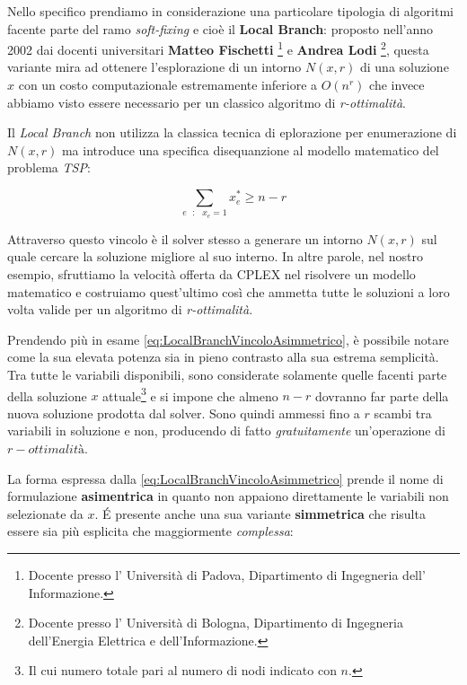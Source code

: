 \documentclass[11pt]{article}
\begin{document}
Nello specifico prendiamo in considerazione una particolare tipologia di algoritmi facente parte del ramo \textit{soft-fixing} e cioè il \textbf{Local Branch}: proposto nell'anno 2002 dai docenti universitari \textbf{Matteo Fischetti} \footnote{Docente presso l' Università di Padova, Dipartimento di Ingegneria dell’ Informazione.} e \textbf{Andrea Lodi} \footnote{Docente presso l' Università di Bologna, Dipartimento di Ingegneria dell'Energia Elettrica e dell'Informazione.}, questa variante mira ad ottenere l'esplorazione di un intorno $N(x,r)$ di una soluzione $x$ con un costo computazionale estremamente inferiore a $O(n^r)$ che invece abbiamo visto essere necessario per un classico algoritmo di \textit{r-ottimalità}.

Il \textit{Local Branch} non utilizza la classica tecnica di eplorazione per enumerazione di $N(x,r)$ ma introduce una specifica disequanzione al modello matematico del problema \textit{TSP}:


\begin{equation}\label{eq:LocalBranchVincoloAsimmetrico}
\displaystyle\sum_{e \text{ } : \text{ } x_e = 1} x_e^{*} \ge n - r
\end{equation}

Attraverso questo vincolo è il solver stesso a generare un intorno $N(x,r)$ sul quale cercare la soluzione migliore al suo interno. In altre parole, nel nostro esempio, sfruttiamo la velocità offerta da CPLEX nel risolvere un modello matematico e costruiamo quest'ultimo così che ammetta tutte le soluzioni a loro volta valide per un algoritmo di \textit{r-ottimalità}.

Prendendo più in esame \eqref{eq:LocalBranchVincoloAsimmetrico}, è possibile notare come la sua elevata potenza sia in pieno contrasto alla sua estrema semplicità. Tra tutte le variabili disponibili, sono considerate solamente quelle facenti parte della soluzione $x$ attuale\footnote{Il cui numero totale pari al numero di nodi indicato con $n$.} e si impone che almeno $n-r$ dovranno far parte della nuova soluzione prodotta dal solver. Sono quindi ammessi fino a $r$ scambi tra variabili in soluzione e non, producendo di fatto \textit{gratuitamente} un'operazione di $r-ottimalità$.

La forma espressa dalla \eqref{eq:LocalBranchVincoloAsimmetrico} prende il nome di formulazione \textbf{asimentrica} in quanto non appaiono direttamente le variabili non selezionate da $x$. \'E presente anche una sua variante \textbf{simmetrica} che risulta essere sia più esplicita che maggiormente \textit{complessa}:
\end{document}

